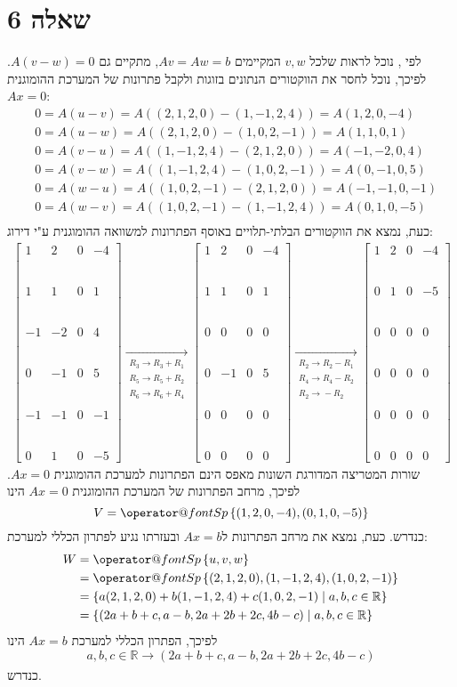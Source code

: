 \documentclass[11pt, oneside]{article}
\makeatletter
\newcommand{\qed}{\R{$\blacksquare$}}
\newcommand{\br}{\\\\\\\\\\\\}
\newcommand{\opr}[1]{\xrightarrow[\text{#1}]{}}
\newcommand{\oprm}[1]{\underset{\substack{#1}}{\longrightarrow}}
\newcommand{\mR}{\mathbb{R}}
\newcommand{\q}[3]{\R{שאלה #3#2.#1}}
\newcommand{\Sp}[1]{\mathop{\operator@font Sp}#1}
\makeatother
\begin{document}
\section{שאלה 6}
לפי \q{3}{7}{1.}, נוכל לראות שלכל $v, w$ המקיימים $Av = Aw = b$, מתקיים גם $A(v - w) = 0$. לפיכך, נוכל לחסר את הווקטורים הנתונים בזוגות ולקבל פתרונות של המערכת ההומוגנית $Ax = 0$:
\begin{align*}
& 0 = A(u - v) = A((2, 1, 2, 0) - (1, -1, 2, 4)) = A(1, 2, 0, -4)\\
& 0 = A(u - w) = A((2, 1, 2, 0) - (1, 0, 2, -1)) = A(1, 1, 0, 1)\\
& 0 = A(v - u) = A((1, -1, 2, 4) - (2, 1, 2, 0)) = A(-1, -2, 0, 4)\\
& 0 = A(v - w) = A((1, -1, 2, 4) - (1, 0, 2, -1)) = A(0, -1, 0, 5)\\
& 0 = A(w - u) = A((1, 0, 2, -1) - (2, 1, 2, 0)) = A(-1, -1, 0, -1)\\
& 0 = A(w - v) = A((1, 0, 2, -1) - (1, -1, 2, 4)) = A(0, 1, 0, -5)\\
\end{align*}
כעת, נמצא את הווקטורים הבלתי-תלויים באוסף הפתרונות למשוואה ההומוגנית ע"י דירוג:
\begin{align*}
\begin{bmatrix}
1 & 2 & 0 & -4\br
1 & 1 & 0 & 1\br
-1 & -2 & 0 & 4\br
0 & -1 & 0 & 5\br
-1 & -1 & 0 & -1\br
0 & 1 & 0 & -5
\end{bmatrix}
\oprm{%
R_3 \opr{} R_3 + R_1\\
R_5 \opr{} R_5 + R_2\\
R_6 \opr{} R_6 + R_4
}
\begin{bmatrix}
1 & 2 & 0 & -4\br
1 & 1 & 0 & 1\br
0 & 0 & 0 & 0\br
0 & -1 & 0 & 5\br
0 & 0 & 0 & 0\br
0 & 0 & 0 & 0
\end{bmatrix}
\oprm{%
R_2 \opr{} R_2 - R_1\\
R_4 \opr{} R_4 - R_2\\
R_2 \opr{} -R_2
}
\begin{bmatrix}
1 & 2 & 0 & -4\br
0 & 1 & 0 & -5\br
0 & 0 & 0 & 0\br
0 & 0 & 0 & 0\br
0 & 0 & 0 & 0\br
0 & 0 & 0 & 0
\end{bmatrix}
\end{align*}
שורות המטריצה המדורגת השונות מאפס הינם הפתרונות למערכת ההומוגנית $Ax = 0$. לפיכך, מרחב הפתרונות של המערכת ההומוגנית $Ax = 0$ הינו
\[
V = \Sp\left\{(1, 2, 0, -4), (0, 1, 0, -5)\right\}
\]
כנדרש. כעת, נמצא את מרחב הפתרונות ל$Ax = b$ ובעזרתו נגיע לפתרון הכללי למערכת:
\begin{align*}
W
& = \Sp\left\{u, v, w\right\}\\
& = \Sp\left\{(2, 1, 2, 0), (1, -1, 2, 4), (1, 0, 2, -1)\right\}\\
& = \left\{a(2, 1, 2, 0) + b(1, -1, 2, 4) + c(1, 0, 2, -1) \mid a, b, c \in \mR\right\}\\
& = \left\{(2a + b + c, a - b, 2a + 2b + 2c, 4b - c) \mid a, b, c \in \mR\right\}
\end{align*}
לפיכך, הפתרון הכללי למערכת $Ax = b$ הינו
\[
a, b, c \in \mR \opr{} (2a + b + c, a - b, 2a + 2b + 2c, 4b - c)
\]
כנדרש.
\br\qed
\end{document}
